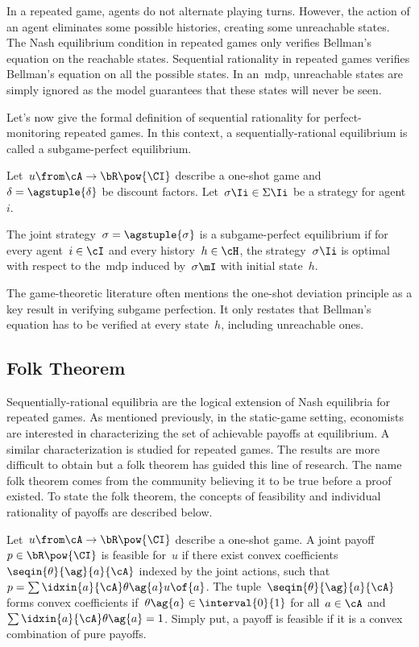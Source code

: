 In a repeated game, agents do not alternate playing turns.
However, the action of an agent eliminates some possible histories, creating some unreachable states.
The Nash equilibrium condition in repeated games only verifies Bellman's equation on the reachable states.
Sequential rationality in repeated games verifies Bellman's equation on all the possible states.
In an~\ac{mdp}, unreachable states are simply ignored as the model guarantees that these states will never be seen.

Let's now give the formal definition of sequential rationality for perfect-monitoring repeated games.
In this context, a sequentially-rational equilibrium is called a subgame-perfect equilibrium.

\begin{definition}
Let~\(u \from \cA \to \bR\pow{\CI}\) describe a one-shot game and~\(\delta = \agstuple{\delta}\) be discount factors.
Let~\(\sigma\Ii \in \Sigma\Ii\) be a strategy for agent~\(i\).

The joint strategy~\(\sigma = \agstuple{\sigma}\) is a subgame-perfect equilibrium if for every agent~\(i \in \cI\) and every history~\(h \in \cH\), the strategy~\(\sigma\Ii\) is optimal with respect to the~\ac{mdp} induced by~\(\sigma\mI\) with initial state~\(h\).
\end{definition}

The game-theoretic literature often mentions the one-shot deviation principle as a key result in verifying subgame perfection.
It only restates that Bellman's equation has to be verified at every state~\(h\), including unreachable ones.

\subsection{Folk Theorem}

Sequentially-rational equilibria are the logical extension of Nash equilibria for repeated games.
As mentioned previously, in the static-game setting, economists are interested in characterizing the set of achievable payoffs at equilibrium.
A similar characterization is studied for repeated games.
The results are more difficult to obtain but a folk theorem has guided this line of research.
The name folk theorem comes from the community believing it to be true before a proof existed.
To state the folk theorem, the concepts of feasibility and individual rationality of payoffs are described below.

\begin{definition}
Let~\(u \from \cA \to \bR\pow{\CI}\) describe a one-shot game.
A joint payoff~\(p \in \bR \pow{\CI}\) is feasible for~\(u\) if there exist convex coefficients \(\seqin{\theta}{\ag}{a}{\cA}\) indexed by the joint actions, such that \(p = \sum\idxin{a}{\cA} \theta\ag{a} u \of{a}\).
The tuple~\(\seqin{\theta}{\ag}{a}{\cA}\) forms convex coefficients if~\(\theta\ag{a} \in \interval{0}{1}\) for all~\(a \in \cA\) and \(\sum\idxin{a}{\cA} \theta\ag{a} = 1\).
Simply put, a payoff is feasible if it is a convex combination of pure payoffs.
\end{definition}

